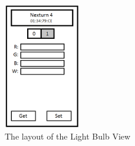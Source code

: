 \documentclass[a4paper]{article}
\begin{document}
\begin{description}
\begin{figure}[H]
    \centering
    \includegraphics[width=0.3\textwidth]{pic3.png}
    \caption{The layout of the Light Bulb View}
    \label{fig:mylightbulbview}
\end{figure}

\end{description}
\end{document}
